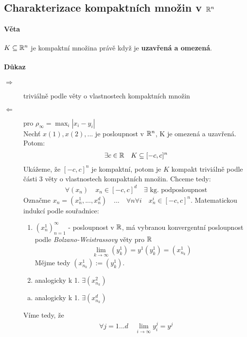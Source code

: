 \documentclass[a4paper,10pt]{article}
\begin{document}
\subsection{Charakterizace kompaktních množin v $\mathbb{R}^n$}
\setcounter{equation}{0}
\paragraph{Věta}
$K \subseteq \mathbb{R}^n$ je kompaktní množina právě když je \textbf{uzavřená a omezená}.
\paragraph{Důkaz}
\begin{description}
	\item[$\Rightarrow$] triviálně podle věty o vlastnostech kompaktních množin
	\item[$\Leftarrow$] pro $\rho_\infty = \max_i |x_i - y_i|$ \\
	Nechť $x(1), x(2), ...$ je posloupnost v $\mathbb{R}^n$, K je omezená a uzavřená.
	Potom:
	\begin{align}
		\exists c \in \mathbb{R} \quad K \subseteq [-c,c]^n
	\end{align}
	Ukážeme, že $[-c,c]^n$ je kompaktní, potom je $K$ kompakt triviálně podle části 3 věty o
	vlastnostech kompaktních množin. Chceme tedy:
	\begin{align}
		\forall (x_n) \quad x_n \in [-c,c]^d \quad \exists\text{ kg.
		podposloupnost}
	\end{align}
	Označme $x_n = (x_n^1, ..., x_n^d) \quad ... \quad \forall n \forall i \quad
	x_n^i\in[-c,c]^n$. Matematickou indukcí podle souřadnice:
	\begin{enumerate}[1.]
		\item $(x_n^1)_{n=1}^\infty$ - posloupnost v $\mathbb{R}$, má vybranou konvergentní
			posloupnost podle \textit{Bolzano-Weistrassovy} věty pro $\mathbb{R}$
			\begin{align}
				\lim_{k\to\infty} (y_k^1) = y^1 
				(y_k^1) =	(x_{n_k}^1)
			\end{align}
			Mějme tedy $(x_{n_k}^1) := (y_k^1)$.
		\item 	analogicky k 1. $\exists (x_{n_k}^2)$
	\end{enumerate}
	\begin{enumerate}[d.]
		\item analogicky k 1. $\exists (x_{n_k}^d)$
	\end{enumerate}
	Víme tedy, že 
	\begin{align}
		\forall j = 1...d \quad \lim_{i\to\infty} y_i^j = y^j

\end{align}
\end{description}
\end{document}
